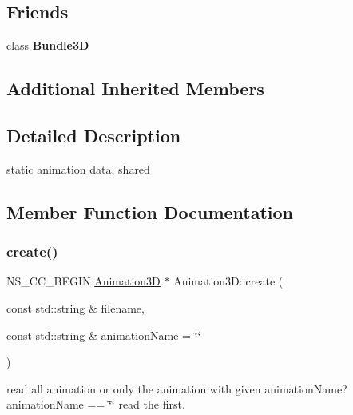 \subsection*{Friends}
\begin{DoxyCompactItemize}
\item 
\mbox{\label{classAnimation3D_a0077a8abf4cf1a83da4f05b96105dd21}} 
class {\bfseries Bundle3D}
\end{DoxyCompactItemize}
\subsection*{Additional Inherited Members}


\subsection{Detailed Description}
static animation data, shared 

\subsection{Member Function Documentation}
\mbox{\label{classAnimation3D_a3abe67768d733db99aaa5a6b1a8a3d3f}} 
\subsubsection{\texorpdfstring{create()}{create()}\hspace{0.1cm}{\footnotesize\ttfamily [1/2]}}
{\footnotesize\ttfamily N\+S\+\_\+\+C\+C\+\_\+\+B\+E\+G\+IN \hyperlink{classAnimation3D}{Animation3D} $\ast$ Animation3\+D\+::create (\begin{DoxyParamCaption}\item[{const std\+::string \&}]{filename,  }\item[{const std\+::string \&}]{animation\+Name = {\ttfamily \char`\"{}\char`\"{}} }\end{DoxyParamCaption})\hspace{0.3cm}{\ttfamily [static]}}

read all animation or only the animation with given animation\+Name? animation\+Name == \char`\"{}\char`\"{} read the first. \mbox{\label{classAnimation3D_a43d40453c37ad04b1624008a7cccd01b}} 

